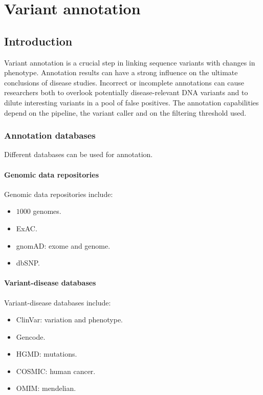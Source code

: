 \chapter{Variant annotation}

\section{Introduction}
Variant annotation is a crucial step in linking sequence variants with changes in phenotype.
Annotation results can have a strong influence on the ultimate conclusions of disease studies.
Incorrect or incomplete annotations can cause researchers both to overlook potentially disease-relevant DNA variants and to dilute interesting variants in a pool of false positives.
The annotation capabilities depend on the pipeline, the variant caller and on the filtering threshold used.


	\subsection{Annotation databases}
	Different databases can be used for annotation.

		\subsubsection{Genomic data repositories}
		Genomic data repositories include:

		\begin{multicols}{4}
			\begin{itemize}
				\item $1000$ genomes.
				\item ExAC.
				\item gnomAD: exome and genome.
				\item dbSNP.
			\end{itemize}
		\end{multicols}

		\subsubsection{Variant-disease databases}
		Variant-disease databases include:

		\begin{multicols}{3}
			\begin{itemize}
				\item ClinVar: variation and phenotype.
				\item Gencode.
				\item HGMD: mutations.
				\item COSMIC: human cancer.
				\item OMIM: mendelian.
			\end{itemize}
		\end{multicols}

